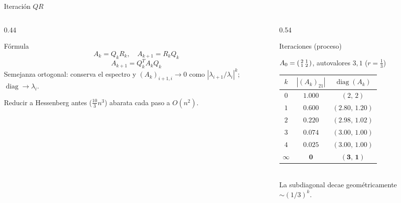 \documentclass[aspectratio=169,10pt]{beamer}
\begin{document}
\begin{frame}{Iteración $QR$}
\begin{columns}[T]
\begin{column}{0.44\textwidth}
\begin{cardidea}{Fórmula}{\faSuperscript}
$$A_k=Q_kR_k,\quad A_{k+1}=R_kQ_k$$
$$A_{k+1}=Q_k^{T}A_kQ_k$$
{\footnotesize Semejanza ortogonal: conserva el espectro y $(A_k)_{i+1,i}\to0$ como $|\lambda_{i+1}/\lambda_i|^k$; $\operatorname{diag}\to\lambda_i$.}
\end{cardidea}
\vspace{1mm}
\begin{cardnota}[\faInfoCircle]{\footnotesize Reducir a Hessenberg antes ($\tfrac{10}{3}n^3$) abarata cada paso a $O(n^2)$.}\end{cardnota}
\end{column}
\begin{column}{0.54\textwidth}
\begin{cardgear}{Iteraciones (proceso)}{\faTable}
\centering
{\footnotesize $A_0=\begin{psmallmatrix}2&1\\1&2\end{psmallmatrix}$, autovalores $3,1$ ($r=\tfrac13$)\\[1mm]
\renewcommand{\arraystretch}{1.2}
\begin{tabular}{c|cc}
$k$ & $|(A_k)_{21}|$ & $\operatorname{diag}(A_k)$\\\hline
$0$&$1.000$&$(2,\,2)$\\ $1$&$0.600$&$(2.80,\,1.20)$\\ $2$&$0.220$&$(2.98,\,1.02)$\\ $3$&$0.074$&$(3.00,\,1.00)$\\ $4$&$0.025$&$(3.00,\,1.00)$\\ $\infty$&$\mathbf 0$&$(\mathbf 3,\,\mathbf 1)$\\
\end{tabular}}\\[1mm]
{\footnotesize La subdiagonal decae geométricamente $\sim(1/3)^k$.}
\end{cardgear}
\end{column}
\end{columns}
\end{frame}
\end{document}
